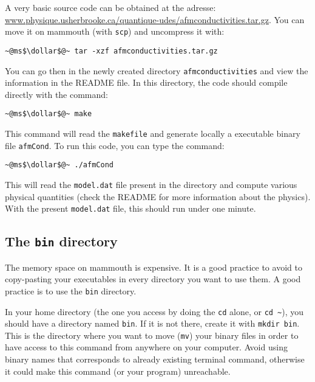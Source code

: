 \documentclass[10pt,letter]{article}
\newcommand{\dollar}{\mbox{\textdollar}}
\begin{document}
A very basic source code can be obtained at the adresse: \\ \url{www.physique.usherbrooke.ca/quantique-udes/afmconductivities.tar.gz}. You can move it on mammouth (with \texttt{scp}) and uncompress it with: 
\begin{bashInput}
\begin{lstlisting}[style=BashInputStyle]
~@ms$\dollar$@~ tar -xzf afmconductivities.tar.gz
\end{lstlisting}
\end{bashInput}
You can go then in the newly created directory \texttt{afmconductivities}  and view the information in the README file.
In this directory, the code should compile directly with the command:
\begin{bashInput}
\begin{lstlisting}[style=BashInputStyle]
~@ms$\dollar$@~ make
\end{lstlisting}
\end{bashInput}
This command will read the \texttt{makefile}  and generate locally a executable binary file \texttt{afmCond}.
To run this code, you can type the command:
\begin{bashInput}
\begin{lstlisting}[style=BashInputStyle]
~@ms$\dollar$@~ ./afmCond
\end{lstlisting}
\end{bashInput}
This will read the \texttt{model.dat} file present in the directory and compute various physical quantities
(check the README for more information about the physics). 
With the present \texttt{model.dat} file, this should run under one minute.

\subsection{The \protect\Verb+bin+  directory}

The memory space on mammouth is expensive.
It is a good practice to avoid to copy-pasting your executables in every directory you want to use them.
A good practice is to use the \texttt{bin} directory.

In your home directory (the one you access by doing the \texttt{cd}  alone, or \texttt{cd \~}), you should have a directory named \texttt{bin}.
If it is not there, create it with \texttt{mkdir bin}.
This is the directory where you want to move (\texttt{mv}) your binary files in order to have access to this 
command from anywhere on your computer.
Avoid using binary names that corresponds to already existing terminal command, otherwise it could make this 
command (or your program) unreachable.
\end{document}
